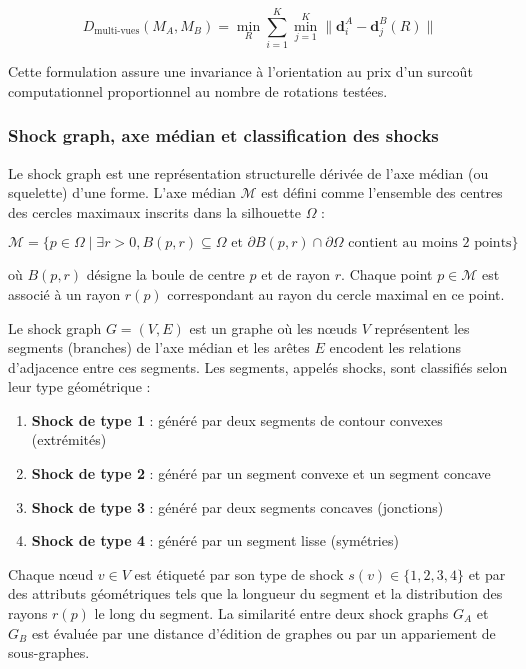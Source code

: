 \documentclass[11pt,a4paper,oneside]{report}
\begin{document}
$$D_{\text{multi-vues}}(M_A, M_B) = \min_{R} \sum_{i=1}^K \min_{j=1}^K \|\mathbf{d}_i^A - \mathbf{d}_j^B(R)\|$$

Cette formulation assure une invariance à l'orientation au prix d'un surcoût computationnel proportionnel au nombre de rotations testées.

\subsubsection{Shock graph, axe médian et classification des shocks}

Le shock graph est une représentation structurelle dérivée de l'axe médian (ou squelette) d'une forme. L'axe médian $\mathcal{M}$ est défini comme l'ensemble des centres des cercles maximaux inscrits dans la silhouette $\Omega$ :

$$\mathcal{M} = \{p \in \Omega \mid \exists r > 0, B(p, r) \subseteq \Omega \text{ et } \partial B(p, r) \cap \partial\Omega \text{ contient au moins 2 points}\}$$

où $B(p, r)$ désigne la boule de centre $p$ et de rayon $r$. Chaque point $p \in \mathcal{M}$ est associé à un rayon $r(p)$ correspondant au rayon du cercle maximal en ce point.

Le shock graph $G = (V, E)$ est un graphe où les nœuds $V$ représentent les segments (branches) de l'axe médian et les arêtes $E$ encodent les relations d'adjacence entre ces segments. Les segments, appelés shocks, sont classifiés selon leur type géométrique :

\begin{enumerate}
    \item \textbf{Shock de type 1} : généré par deux segments de contour convexes (extrémités)
    \item \textbf{Shock de type 2} : généré par un segment convexe et un segment concave
    \item \textbf{Shock de type 3} : généré par deux segments concaves (jonctions)
    \item \textbf{Shock de type 4} : généré par un segment lisse (symétries)
\end{enumerate}

Chaque nœud $v \in V$ est étiqueté par son type de shock $s(v) \in \{1, 2, 3, 4\}$ et par des attributs géométriques tels que la longueur du segment et la distribution des rayons $r(p)$ le long du segment. La similarité entre deux shock graphs $G_A$ et $G_B$ est évaluée par une distance d'édition de graphes ou par un appariement de sous-graphes.
\end{document}
